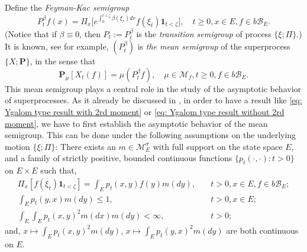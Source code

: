 \documentclass[12pt, a4paper]{amsart}
\theoremstyle{definition}
\newenvironment{asp}[1]{\renewcommand\theinnerasp{#1}\innerasp}{\endinnerasp}
\numberwithin{equation}{section}
\begin{document}
	Define the \emph{Feyman-Kac semigroup} 
\[
	P^\beta_tf(x) 
	= \Pi_x \big[e^{\int_0^{t\wedge \zeta} \beta(\xi_r)dr} f(\xi_t)\mathbf 1_{t<\zeta}\big],
	\quad t\geq 0, x\in E, f\in b\mathscr B_E.
\]
	(Notice that if $\beta \equiv 0$, then $P_t:= P^\beta_t$ is the \emph{transition semigroup} of process $\{\xi; \Pi\}$.) 
	It is known, see \cite[Proposition 2.27]{Li2011Measure-valued} for example, $(P^\beta_t)$ is \emph{the mean semigroup} of the superprocess $\{X; \mathbf P\}$, in the sense that
	\[ \label{eq: Ygalom type result without 2rd moment}
	\mathbf P_\mu [X_t(f)]
	= \mu(P^\beta_t f),
	\quad \mu \in \mathcal M_f, t \geq 0,f \in b\mathscr B_E.
	\]
	This mean semigroup plays a central role in the study of the asymptotic behavior of superprocesses.
	As it already be discussed in \cite{EvansPerkins1990Measure-valued}, in order to have a result like \eqref{eq: Ygalom type result with 2rd moment} or \eqref{eq: Ygalom type result without 2rd moment}, we have to first establish the asymptotic behavior of the mean semigroup. 
	This can be done under the following assumptions on the underlying motion $\{\xi; \Pi\}$:
\begin{asp}{1}
\label{asp: 1}
	There exists an $m \in \mathcal M_E^\sigma$ with full support on the state space $E$, and a family of strictly positive, bounded continuous functions $\{ p_t(\cdot,\cdot): t > 0 \}$ on $E \times E$ such that,
\[\begin{split}
	\Pi_x[ f(\xi_t)\mathbf 1_{t < \zeta} ]
	= \int_E p_t(x,y) f(y) m(dy),
	&\quad t>0, x \in E,f \in b\mathscr B_E;
	\\\int_E p_t(y,x)m(dy)
	\leq 1,	
	&\quad t>0,x\in E;
	\\\int_E \int_E p_t(x,y)^2 m(dx) m(dy)
	<\infty,
	&\quad t> 0;
\end{split}\]
	and, $x \mapsto \int_E p_t(x,y)^2 m(dy)$, $x \mapsto \int_E p_t(y,x)^2 m(dy)$ are both continuous on $E$.
\end{asp}
\end{document}
